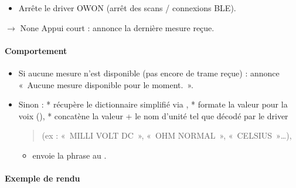 \documentclass[letterpaper,10pt,french]{sphinxmanual}
\begin{document}
\begin{fulllineitems}
\begin{fulllineitems}
\begin{itemize}
\item {} 
\sphinxAtStartPar
Arrête le driver OWON (arrêt des scans / connexions BLE).

\end{itemize}

\end{fulllineitems}


\begin{fulllineitems}
\label{\detokenize{api/modes:modes.mode_multimeter.ModeMultimetre.on_short_press}}
\pysigstartsignatures
\pysiglinewithargsret
{}
{}
{{ $\rightarrow$ None}}
\pysigstopsignatures
\sphinxAtStartPar
Appui court : annonce la dernière mesure reçue.


\paragraph{Comportement}
\label{\detokenize{api/modes:comportement}}\begin{itemize}
\item {} 
\sphinxAtStartPar
Si aucune mesure n’est disponible (pas encore de trame reçue) :
annonce « Aucune mesure disponible pour le moment. ».

\item {} 
\sphinxAtStartPar
Sinon :
* récupère le dictionnaire simplifié via ,
* formate la valeur pour la voix (),
* concatène la valeur + le nom d’unité tel que décodé par le driver
\begin{quote}

\sphinxAtStartPar
(ex : « MILLI VOLT DC », « OHM NORMAL », « CELSIUS »…),
\end{quote}
\begin{itemize}
\item {} 
\sphinxAtStartPar
envoie la phrase au .

\end{itemize}

\end{itemize}


\paragraph{Exemple de rendu}
\label{\detokenize{api/modes:exemple-de-rendu}}\begin{quote}


\end{quote}
\end{fulllineitems}
\end{fulllineitems}
\end{document}
